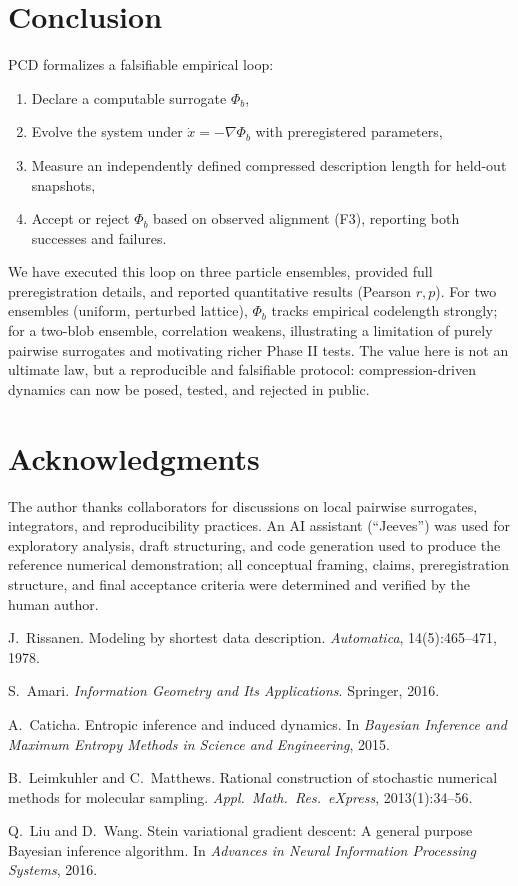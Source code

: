 \documentclass[11pt]{article}
\begin{document}
\section{Conclusion}
PCD formalizes a falsifiable empirical loop:
\begin{enumerate}
    \item Declare a computable surrogate $\Phi_b$,
    \item Evolve the system under $\dot{x}{=}{-}\nabla\Phi_b$ with preregistered parameters,
    \item Measure an independently defined compressed description length for held-out snapshots,
    \item Accept or reject $\Phi_b$ based on observed alignment (F3), reporting both successes and failures.
\end{enumerate}

We have executed this loop on three particle ensembles, provided full preregistration details, and reported quantitative results (Pearson $r,p$).
For two ensembles (uniform, perturbed lattice), $\Phi_b$ tracks empirical codelength strongly; for a two-blob ensemble, correlation weakens, illustrating a limitation of purely pairwise surrogates and motivating richer Phase II tests.
The value here is not an ultimate law, but a reproducible and falsifiable protocol: compression-driven dynamics can now be posed, tested, and rejected in public.

\section*{Acknowledgments}
The author thanks collaborators for discussions on local pairwise surrogates, integrators, and reproducibility practices.
An AI assistant (``Jeeves'') was used for exploratory analysis, draft structuring, and code generation used to produce the reference numerical demonstration; all conceptual framing, claims, preregistration structure, and final acceptance criteria were determined and verified by the human author.


\begin{thebibliography}{9}

J.~Rissanen.
\newblock Modeling by shortest data description.
\newblock \emph{Automatica}, 14(5):465--471, 1978.

S.~Amari.
\newblock \emph{Information Geometry and Its Applications}.
\newblock Springer, 2016.

A.~Caticha.
\newblock Entropic inference and induced dynamics.
\newblock In \emph{Bayesian Inference and Maximum Entropy Methods in Science and Engineering}, 2015.

B.~Leimkuhler and C.~Matthews.
\newblock Rational construction of stochastic numerical methods for molecular sampling.
\newblock \emph{Appl.\ Math.\ Res.\ eXpress}, 2013(1):34--56.

Q.~Liu and D.~Wang.
\newblock Stein variational gradient descent: A general purpose Bayesian inference algorithm.
\newblock In \emph{Advances in Neural Information Processing Systems}, 2016.

\end{thebibliography}
\end{document}
